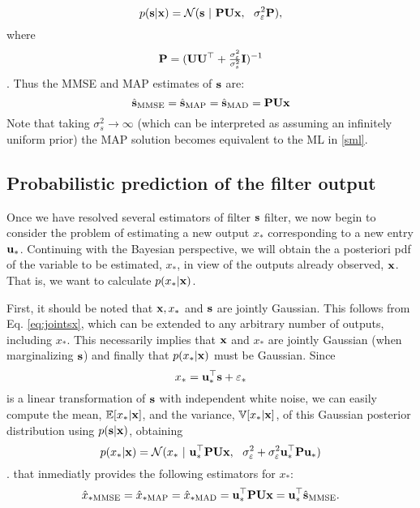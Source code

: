 \begin{equation}
p({\mathbf s}|{\mathbf x}) = {\mathcal N}({\mathbf s}~|~ {\mathbf P} {\mathbf U} {\mathbf x},~~ \sigma_\varepsilon^2{\mathbf P}) ,
\end{equation}
where
\begin{align}
{\mathbf P} = ({\mathbf U}{\mathbf U}^\top  + \tfrac{\sigma_\varepsilon^2}{\sigma_s^2}{\mathbf I})^{-1}
\end{align}.
Thus the MMSE and MAP estimates of ${\mathbf s}$ are:
\begin{equation}
\hat{{\mathbf s}}_\text{MMSE} =\hat{{\mathbf s}}_\text{MAP} =\hat{{\mathbf s}}_\text{MAD} = {\mathbf P}  {\mathbf U} {\mathbf x}
\label{smmse}
\end{equation}
Note that taking $\sigma_s^2\rightarrow\infty$ (which can be interpreted as assuming an infinitely uniform prior) the MAP solution becomes equivalent to the ML in \eqref{sml}.


\subsection{Probabilistic prediction of the filter output}

Once we have resolved several estimators of filter ${\mathbf s}$ filter, we now begin to consider the problem of estimating a new output $x_*$ corresponding to a new entry $ {\mathbf u}_*$. Continuing with the Bayesian perspective, we will obtain the a posteriori pdf of the variable to be estimated, $x_*$, in view of the outputs already observed, ${\mathbf x}$. That is, we want to calculate $p (x_* | {\mathbf x})$.

First, it should be noted that ${\mathbf x}, x_*$ and ${\mathbf s}$ are jointly Gaussian. This follows from Eq. \eqref{eq:jointsx}, which can be extended to any arbitrary number of outputs, including $x_*$. This necessarily implies that ${\mathbf x}$ and $x_*$ are jointly Gaussian (when marginalizing ${\mathbf s}$) and finally that $p(x_* | {\mathbf x}) $ must be Gaussian. Since
\begin{equation}
x_* = {\mathbf u}_*^\top{\mathbf s}+\varepsilon_*
\end{equation}
is a linear transformation of ${\mathbf s}$ with independent white noise, we can easily compute the mean, $\mathbb{E}[x_*|{\mathbf x}]$, and the variance, $\mathbb{V}[x_*|{\mathbf x}]$, of this Gaussian posterior distribution using $p({\mathbf s}|{\mathbf x})$, obtaining
%
\begin{equation}
p(x_*|{\mathbf x}) = {\mathcal N}(x_*~|~ {\mathbf u}_*^\top{\mathbf P}  {\mathbf U} {\mathbf x},~~
                    \sigma_\varepsilon^2+\sigma_\varepsilon^2{\mathbf u}_*^\top{\mathbf P} {\mathbf u}_*)
\end{equation}.
that inmediatly provides the following estimators for $x_*$:
\begin{equation}
\hat{x}_{*\text{MMSE} } =\hat{x}_{*\text{MAP} } =\hat{x}_{*\text{MAD} }  =  {\mathbf u}_*^\top{\mathbf P}  {\mathbf U} {\mathbf x} = {\mathbf u}_*^\top\hat{{\mathbf s}}_\text{MMSE}.
\end{equation}

